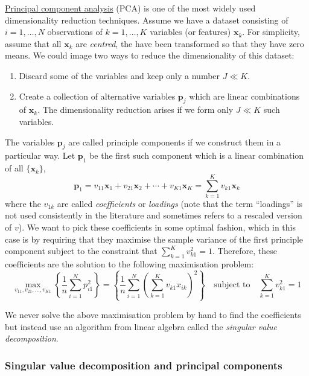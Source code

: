 \documentclass{scrartcl}
\providecommand{\tightlist}{%
      \setlength{\itemsep}{0pt}\setlength{\parskip}{0pt}}
\begin{document}
\href{https://en.wikipedia.org/wiki/Principal_component_analysis}{Principal
component analysis} (PCA) is one of the most widely used dimensionality
reduction techniques. Assume we have a dataset consisting of
\(i = 1,\dots,N\) observations of \(k = 1,\dots,K\) variables (or
features) \(\mathbf{x}_k\). For simplicity, assume that all
\(\mathbf{x}_k\) are \emph{centred}, \ie the have been transformed so
that they have zero means. We could image two ways to reduce the
dimensionality of this dataset:

\begin{enumerate}
\def\labelenumi{\arabic{enumi}.}
\tightlist
\item
  Discard some of the variables and keep only a number \(J \ll K\).
\item
  Create a collection of alternative variables \(\mathbf{p}_j\) which
  are linear combinations of \(\mathbf{x}_k\). The dimensionality
  reduction arises if we form only \(J \ll K\) such variables.
\end{enumerate}

The variables \(\mathbf{p}_j\) are called principle components if we
construct them in a particular way. Let \(\mathbf{p}_1\) be the first
such component which is a linear combination of all
\(\{\mathbf{x}_k\}\), \[
\mathbf{p}_1 = v_{11} \mathbf{x}_1 + v_{21} \mathbf{x}_2 + \cdots + v_{K1} \mathbf{x}_K
    = \sum_{k=1}^K v_{k1} \mathbf{x}_{k}
\] where the \(v_{1k}\) are called \emph{coefficients} or
\emph{loadings} (note that the term ``loadings'' is not used
consistently in the literature and sometimes refers to a rescaled
version of \(v\)). We want to pick these coefficients in some optimal
fashion, which in this case is by requiring that they maximise the
sample variance of the first principle component subject to the
constraint that \(\sum_{k=1}^K v_{k1}^2 = 1\). Therefore, these
coefficients are the solution to the following maximisation problem: \[
\max_{v_{11},v_{21},\dots,v_{K1}} 
\left\{ 
    \frac{1}{n}\sum_{i=1}^N p_{i1}^2
\right\}
= 
\left\{ 
    \frac{1}{n}\sum_{i=1}^N \left( \sum_{k=1}^K v_{k1} x_{ik} \right)^2
\right\} 
\quad \text{subject to} \quad 
 \sum_{k=1}^K v_{k1}^2 = 1
\]

We never solve the above maximisation problem by hand to find the
coefficients but instead use an algorithm from linear algebra called the
\emph{singular value decomposition}.

    \hypertarget{singular-value-decomposition-and-principal-components}{%
\subsubsection{Singular value decomposition and principal
components}\label{singular-value-decomposition-and-principal-components}}
\end{document}
